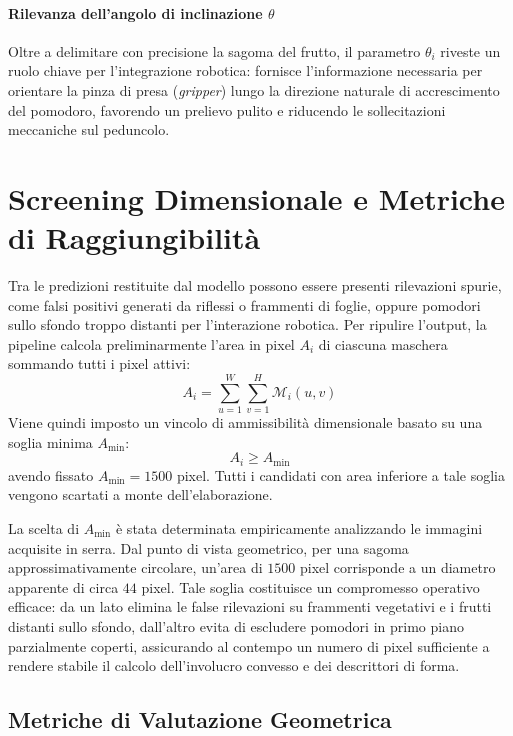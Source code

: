 \paragraph{Rilevanza dell'angolo di inclinazione $\theta$}
Oltre a delimitare con precisione la sagoma del frutto, il parametro $\theta_i$ riveste un ruolo chiave per l'integrazione robotica: fornisce l'informazione necessaria per orientare la pinza di presa (\textit{gripper}) lungo la direzione naturale di accrescimento del pomodoro, favorendo un prelievo pulito e riducendo le sollecitazioni meccaniche sul peduncolo.

\section{Screening Dimensionale e Metriche di Raggiungibilità}
\label{sec:screening_geometrico}

Tra le predizioni restituite dal modello possono essere presenti rilevazioni spurie, come falsi positivi generati da riflessi o frammenti di foglie, oppure pomodori sullo sfondo troppo distanti per l'interazione robotica. Per ripulire l'output, la pipeline calcola preliminarmente l'area in pixel $A_i$ di ciascuna maschera sommando tutti i pixel attivi:
\begin{equation}
    A_i = \sum_{u=1}^{W} \sum_{v=1}^{H} \mathcal{M}_i(u, v)
    \label{eq:area_definizione}
\end{equation}
Viene quindi imposto un vincolo di ammissibilità dimensionale basato su una soglia minima $A_{\min}$:
\begin{equation}
    A_i \ge A_{\min}
    \label{eq:area_min}
\end{equation}
avendo fissato $A_{\min} = 1500$ pixel. Tutti i candidati con area inferiore a tale soglia vengono scartati a monte dell'elaborazione.

La scelta di $A_{\min}$ è stata determinata empiricamente analizzando le immagini acquisite in serra. Dal punto di vista geometrico, per una sagoma approssimativamente circolare, un'area di $1500$ pixel corrisponde a un diametro apparente di circa $44$ pixel. Tale soglia costituisce un compromesso operativo efficace: da un lato elimina le false rilevazioni su frammenti vegetativi e i frutti distanti sullo sfondo, dall'altro evita di escludere pomodori in primo piano parzialmente coperti, assicurando al contempo un numero di pixel sufficiente a rendere stabile il calcolo dell'involucro convesso e dei descrittori di forma.

\subsection{Metriche di Valutazione Geometrica}
\label{subsec:metriche_geometriche}

